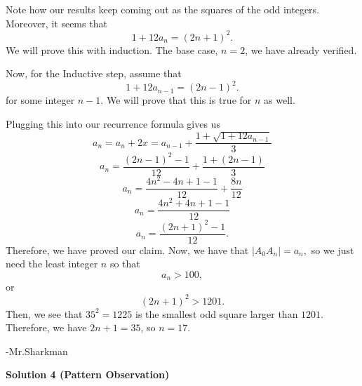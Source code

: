 \begin{enumerate}
 Note how our results keep coming out as the squares of the odd integers. Moreover, it seems that 
 \[1+12a_{n} = (2n+1)^{2}.\]We will prove this with induction. The base case, $n=2$, we have already verified.

 Now, for the Inductive step, assume that 
 \[1+12a_{n-1} = (2n-1)^{2}.\] for some integer $n-1$. We will prove that this is true for $n$ as well. 

 Plugging this into our recurrence formula gives us
 \[a_{n} = a_{n}+2x = a_{n-1}+\frac{1 + \sqrt{1+12a_{n-1}}}{3}\]
 \[a_{n} = \frac{(2n-1)^{2}-1}{12} + \frac{1 + (2n-1)}{3}\]
 \[a_{n} = \frac{4n^{2}-4n+1-1}{12} + \frac{8n}{12}\]
 \[a_{n} = \frac{4n^{2}+4n+1-1}{12}\]
 \[a_{n} = \frac{(2n+1)^{2}-1}{12}.\]Therefore, we have proved our claim. Now, we have that $|A_{0}A_{n}|=a_{n},$ so we just need the least integer $n$ so that 
 \[a_{n} > 100,\]or
 \[(2n+1)^{2} > 1201.\]Then, we see that $35^{2} = 1225$ is the smallest odd square larger than $1201.$ Therefore, we have $2n+1=35$, so $n = \boxed{17}.$

 -Mr.Sharkman

 



\textbf{Solution 4 (Pattern Observation)}


\end{enumerate}

